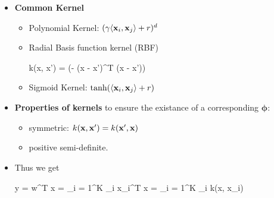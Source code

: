\begin{itemize}
	\item \textbf{Common Kernel}
	\begin{itemize}
		\item Polynomial Kernel: $(\gamma \langle \mathbf{x}_i, \mathbf{x}_j \rangle + r) ^d$
		\item Radial Basis function kernel (RBF)
			\begin{myalign*}
	    			 k(\*x, \*x') = \exp(- (\*x - \*x')^T (\*x - \*x'))
			 \end{myalign*} 
		\item Sigmoid Kernel: $\tanh (\langle \mathbf{x}_i, \mathbf{x}_j \rangle + r)$ 
	\end{itemize}
	 
	\item \textbf{Properties of kernels} to ensure the existance of a corresponding $\bm \phi$:
	\begin{itemize}
		\item symmetric: $k(\mathbf{x}, \mathbf{x}') = k(\mathbf{x}', \mathbf{x})$
		\item positive semi-definite.
	\end{itemize}
	\item Thus we get
	\begin{myalign*}
	    \*y = \*w^T \*x = \sum_{i = 1}^K \alpha_i \*x_i^T \*x = \sum_{i = 1}^K \alpha_i k(\*x, \*x_i) 
	\end{myalign*}
\end{itemize}



